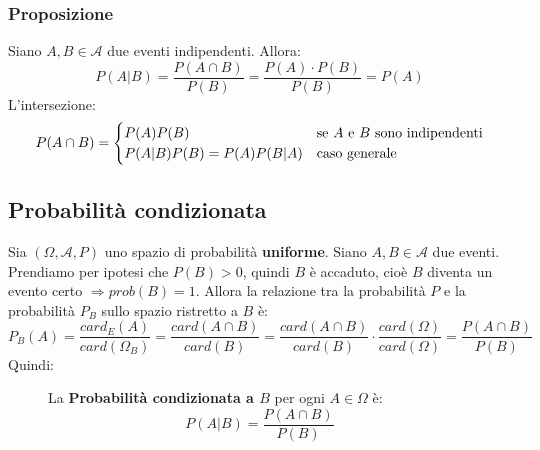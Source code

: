 \documentclass[a4paper]{article}
\theoremstyle{break}
\theoremstyle{break}
\theoremstyle{break}
\theoremstyle{break}
\begin{document}
\subsubsection{Proposizione}
Siano \( A,B \in \mathcal{A} \) due eventi indipendenti. Allora:
\[
  P(A|B) = \frac{P(A \cap B)}{P(B)} = \frac{P(A) \cdot P(B)}{P(B)} = P(A)
\] 
L'intersezione:
\[
   P(A \cap B) = \begin{cases}
    P(A)P(B) & \text{se \( A \) e \( B \) sono indipendenti} \\
    P(A|B)P(B) = P(A)P(B|A) & \text{caso generale} 
   \end{cases}
\] 

\subsection{Probabilità condizionata}
Sia \( (\Omega, \mathcal{A}, P) \) uno spazio di probabilità \textbf{uniforme}. Siano \( A,B \in \mathcal{A} \)
due eventi. Prendiamo per ipotesi che \( P(B) > 0 \), quindi \( B \) è accaduto, cioè
\( B \) diventa un evento certo \( \Rightarrow prob(B) = 1 \). Allora la relazione tra
la probabilità \( P \) e la probabilità \( P_B \) sullo spazio ristretto a \( B \) è:
\[
	P_B(A) = \frac{card_E(A)}{card(\Omega_B)} = \frac{card(A \cap B)}{card(B)} =
	\frac{card(A \cap B)}{card(B)} \cdot \frac{card(\Omega)}{card(\Omega)} =
	\frac{P(A \cap B)}{P(B)}
\]
Quindi:
\begin{figure}[H]
	\begin{definition}
		La \textbf{Probabilità condizionata a \( B \)} per ogni \( A \in \Omega \) è:
		\[
			P(A|B) = \frac{P(A \cap B)}{P(B)}
		\]
	\end{definition}
\end{figure}
\end{document}
